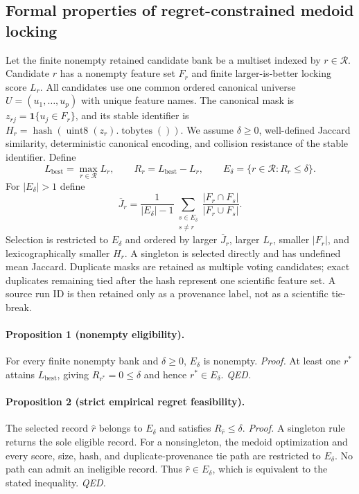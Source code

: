 \subsection{Formal properties of regret-constrained medoid locking}

Let the finite nonempty retained candidate bank be a multiset indexed by
$r\in\mathcal R$. Candidate $r$ has a nonempty feature set $F_r$ and finite
larger-is-better locking score $L_r$. All candidates use one common ordered
canonical universe $U=(u_1,\ldots,u_p)$ with unique feature names. The
canonical mask is $z_{rj}=\mathbf 1\{u_j\in F_r\}$, and its stable identifier is
$H_r=\operatorname{hash}(\operatorname{uint8}(z_r).\operatorname{tobytes}())$.
We assume $\delta\geq0$, well-defined Jaccard similarity, deterministic
canonical encoding, and collision resistance of the stable identifier. Define
\[
L_{\mathrm{best}}=\max_{r\in\mathcal R}L_r,\qquad
R_r=L_{\mathrm{best}}-L_r,\qquad
E_\delta=\{r\in\mathcal R:R_r\leq\delta\}.
\]
For $|E_\delta|>1$ define
\[
\overline J_r=\frac{1}{|E_\delta|-1}
\sum_{\substack{s\in E_\delta\\s\ne r}}
\frac{|F_r\cap F_s|}{|F_r\cup F_s|}.
\]
Selection is restricted to $E_\delta$ and ordered by larger $\overline J_r$,
larger $L_r$, smaller $|F_r|$, and lexicographically smaller $H_r$. A singleton
is selected directly and has undefined mean Jaccard. Duplicate masks are
retained as multiple voting candidates; exact duplicates remaining tied after
the hash represent one scientific feature set. A source run ID is then retained
only as a provenance label, not as a scientific tie-break.

\paragraph{Proposition 1 (nonempty eligibility).}
For every finite nonempty bank and $\delta\geq0$, $E_\delta$ is nonempty.
\emph{Proof.} At least one $r^*$ attains $L_{\mathrm{best}}$, giving
$R_{r^*}=0\leq\delta$ and hence $r^*\in E_\delta$. \emph{QED.}

\paragraph{Proposition 2 (strict empirical regret feasibility).}
The selected record $\widehat r$ belongs to $E_\delta$ and satisfies
$R_{\widehat r}\leq\delta$.
\emph{Proof.} A singleton rule returns the sole eligible record. For a
nonsingleton, the medoid optimization and every score, size, hash, and
duplicate-provenance tie path are restricted to $E_\delta$. No path can admit
an ineligible record. Thus $\widehat r\in E_\delta$, which is equivalent to the
stated inequality. \emph{QED.}

